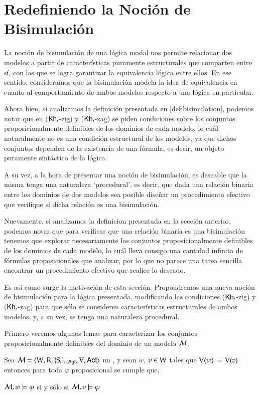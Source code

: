 \chapter{Redefiniendo la Noción de Bisimulación}

La noción de bisimulación de una lógica modal nos permite relacionar dos modelos a partir de características puramente estructurales 
que comparten entre sí, con las que se logra garantizar la equivalencia lógica entre ellos. En ese sentido, consideramos que la 
bisimulación modela la idea de equivalencia en cuanto al comportamiento de ambos modelos respecto a una lógica en particular.

Ahora bien, si analizamos la definición presentada en \ref{def:bisimulation}, podemos notar que en ($\mathsf{Kh}_i$-zig) y ($\mathsf{Kh}_i$-zag) se piden condiciones 
sobre los conjuntos proposicionalmente definibles de los dominios de cada modelo, lo cuál naturalmente no es una condición estructural de los modelos, 
ya que dichos conjuntos dependen de la existencia de una fórmula, es decir, un objeto puramente sintáctico de la lógica. 

A su vez, a la hora de presentar una noción de bisimulación, es deseable que la misma tenga una naturaleza `procedural', es decir,
que dada una relación binaria entre los dominios de dos modelos sea posible diseñar un procedimiento efectivo que verifique si dicha relación 
es una bisimulación.

Nuevamente, si analizamos la definicion presentada en la sección anterior, podemos notar que para verificar que una relación binaria es una bisimulación
tenemos que explorar necesariamente los conjuntos proposicionalmente definibles de los dominios de cada modelo, lo cuál lleva consigo una cantidad 
infinita de fórmulas proposicionales que analizar, por lo que no parece una tarea sencilla encontrar un procedimiento efectivo que realice lo deseado.

Es así como surge la motivación de esta sección. Propondremos una nueva noción de bisimulación para la lógica presentada, modificando las condiciones
($\mathsf{Kh}_i$-zig) y ($\mathsf{Kh}_i$-zag) para que sólo se consideren características estructurales de ambos modelos, y, a su vez, se tenga una naturaleza procedural.

Primero veremos algunos lemas para caracterizar los conjuntos proposicionalmente definibles del dominio de un modelo $\mathcal{M}$.

\begin{lema}\label{ref:propositional-equivalence}
    Sea $\mathcal{M}=\langle \mathrm{W},\mathrm{R},\{ \mathrm{S}_i \}_{i \in {\rm \sf Agt}},\mathrm{V},{\rm \sf Act} \rangle$ un \ults, y sean $w$, $v \in \mathrm{W}$
    tales que $\mathrm{V}(w)$ = $\mathrm{V}(v)$ entonces para toda $\varphi$ proposicional se cumple que, 
    \begin{center}
    $\mathcal{M}, w \models \varphi$ \quad si y sólo si \quad $ 
    \mathcal{M}, v \models \varphi$
    \end{center}
\end{lema}

